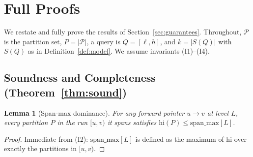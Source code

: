 \documentclass[10pt]{article}
\newtheorem{lemma}{Lemma}
\theoremstyle{definition}
\begin{document}
\section{Full Proofs}
\label{app:proofs}

We restate and fully prove the results of Section~\ref{sec:guarantees}. Throughout,
$\mathcal{P}$ is the partition set, $P=|\mathcal{P}|$, a query is $Q=[\ell,h]$, and
$k=|S(Q)|$ with $S(Q)$ as in Definition~\ref{def:model}. We assume invariants
(I1)--(I4).

\subsection{Soundness and Completeness (Theorem~\ref{thm:sound})}

\begin{lemma}[Span-max dominance]
\label{lem:spanmax}
For any forward pointer $u\!\rightarrow\!v$ at level $L$, every partition $P$ in the run
$[u,v)$ it spans satisfies $\mathrm{hi}(P)\le \mathrm{span\_max}[L]$.
\end{lemma}
\begin{proof}
Immediate from (I2): $\mathrm{span\_max}[L]$ is defined as the maximum of $\mathrm{hi}$
over exactly the partitions in $[u,v)$.
\end{proof}
\end{document}
